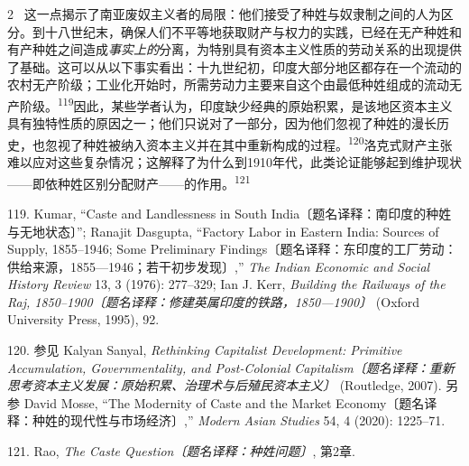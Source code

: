 \documentclass[10pt,a4paper]{article}
\begin{document}
\begin{paracol}{2}
\switchcolumn*
{\scriptsize\color{gray} [p. 22]}\ 这一点揭示了南亚废奴主义者的局限：他们接受了种姓与奴隶制之间的人为区分。到十八世纪末，确保人们不平等地获取财产与权力的实践，已经在无产种姓和有产种姓之间造成\textit{事实上的}分离，为特别具有资本主义性质的劳动关系的出现提供了基础。这可以从以下事实看出：十九世纪初，印度大部分地区都存在一个流动的农村无产阶级；工业化开始时，所需劳动力主要来自这个由最低种姓组成的流动无产阶\mbox{级。\textsuperscript{119}}因此，某些学者认为，印度缺少经典的原始积累，是该地区资本主义具有独特性质的原因之一；他们只说对了一部分，因为他们忽视了种姓的漫长历史，也忽视了种姓被纳入资本主义并在其中重新构成的过\mbox{程。\textsuperscript{120}}洛克式财产主张难以应对这些复杂情况；这解释了为什么到1910年代，此类论证能够起到维护现状——即依种姓区别分配财产——的作\mbox{用。\textsuperscript{121}}\par{\small 119. Kumar, “Caste and Landlessness in South India〔题名译释：南印度的种姓与无地状态〕”; Ranajit Dasgupta, “Factory Labor in Eastern India: Sources of Supply, 1855–1946; Some Preliminary Findings〔题名译释：东印度的工厂劳动：供给来源，1855—1946；若干初步发现〕,” \textit{The Indian Economic and Social History Review} 13, 3 (1976): 277–329; Ian J. Kerr, \textit{Building the Railways of the Raj, 1850–1900〔题名译释：修建英属印度的铁路，1850—1900〕} (Oxford University Press, 1995), 92.\par}{\small 120. 参见 Kalyan Sanyal, \textit{Rethinking Capitalist Development: Primitive Accumulation, Governmentality, and Post-Colonial Capitalism〔题名译释：重新思考资本主义发展：原始积累、治理术与后殖民资本主义〕} (Routledge, 2007). 另参 David Mosse, “The Modernity of Caste and the Market Economy〔题名译释：种姓的现代性与市场经济〕,” \textit{Modern Asian Studies} 54, 4 (2020): 1225–71.\par}{\small 121. Rao, \textit{The Caste Question〔题名译释：种姓问题〕}, 第2章.\par}
\switchcolumn

\end{paracol}
\end{document}
